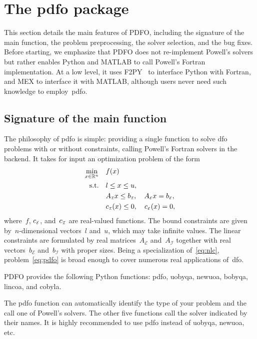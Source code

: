\documentclass[
    smallextended,  %
    final,        %
]{svjour3}
\newcommand{\R}{\mathbb{R}}
\newcommand{\aeq}{A_{\scriptscriptstyle\mathcal{E}}}
\newcommand{\aub}{A_{\scriptscriptstyle\mathcal{I}}}
\newcommand{\beq}{b_{\scriptscriptstyle\mathcal{E}}}
\newcommand{\bub}{b_{\scriptscriptstyle\mathcal{I}}}
\newcommand{\ceq}{\con[\scriptscriptstyle\mathcal{E}]}
\newcommand{\con}[1][i]{c\ifthenelse{\equal{#1}{}}{}{_{#1}}}
\newcommand{\cub}{\con[\scriptscriptstyle\mathcal{I}]}
\newcommand{\obj}{f}
\newcommand{\st}{\text{s.t.}}
\newcommand{\xl}{l}
\newcommand{\xu}{u}
\begin{document}
\section{The \gls{pdfo} package}
\label{sec:pdfo}

This section details the main features of PDFO, including the signature of the main
function, the problem preprocessing, the solver selection, and the bug fixes. Before starting, we
emphasize that PDFO does not re-implement Powell’s solvers but rather enables Python and MATLAB
to call Powell's Fortran implementation.
At a low level, it uses F2PY~\cite{Peterson_2009} to interface Python with Fortran, and MEX to
interface it with MATLAB, although users never need such knowledge to employ~\gls{pdfo}.

\subsection{Signature of the main function}

The philosophy of \gls{pdfo} is simple: providing a single function to solve \gls{dfo} problems
with or without constraints, calling Powell's Fortran solvers in the backend.
It takes for input an optimization problem of the form
\begin{subequations}
    \label{eq:pdfo}
    \begin{align}
        \min_{x \in \R^n}   & \quad \obj(x)\\
        \st                 & \quad \xl \le x \le \xu, \label{eq:pdfo-b}\\
                            & \quad \aub x \le \bub, \quad \aeq x = \beq, \label{eq:pdfo-l}\\
                            & \quad \cub(x) \le 0, \quad \ceq(x) = 0, \label{eq:pdfo-nl}
    \end{align}
\end{subequations}
where~$\obj$, $\ceq$, and~$\cub$ are real-valued functions. The bound constraints are given
by~$n$-dimensional vectors~$\xl$ and~$\xu$, which may take infinite values. The linear constraints
are formulated by real matrices~$\aeq$ and~$\aub$ together with real vectors~$\beq$ and~$\bub$ with
proper sizes. Being a specialization of~\eqref{eq:nlc}, problem~\eqref{eq:pdfo} is broad enough to
cover numerous real applications of~\gls{dfo}.

PDFO provides the following Python functions: pdfo, uobyqa, newuoa, bobyqa, lincoa, and cobyla.

The pdfo function can automatically identify the type of your problem and the call one of Powell's solvers. The other five functions call the solver indicated by their names. It is highly recommended to use pdfo instead of uobyqa, newuoa, etc.
\end{document}
